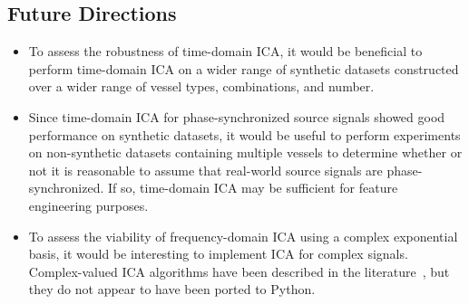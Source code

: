 \documentclass[10pt]{article}
\begin{document}
\subsection*{Future Directions}
\begin{itemize}
    \item To assess the robustness of time-domain ICA, it would be beneficial to perform
        time-domain ICA on a wider range of synthetic datasets constructed over a wider
        range of vessel types, combinations, and number.

    \item Since time-domain ICA for phase-synchronized source signals showed good
        performance on synthetic datasets, it would be useful to perform experiments
        on non-synthetic datasets containing multiple vessels to determine whether or not
        it is reasonable to assume that real-world source signals are phase-synchronized.
        If so, time-domain ICA may be sufficient for feature engineering purposes.

    \item To assess the viability of frequency-domain ICA using a complex exponential
        basis, it would be interesting to implement ICA for complex signals. Complex-valued
        ICA algorithms have been described in the
        literature~\cite{novey:2006,novey:2007,novey:2008,novey:2008b}, but they do not
        appear to have been ported to Python.
\end{itemize}

\printbibliography
\end{document}
